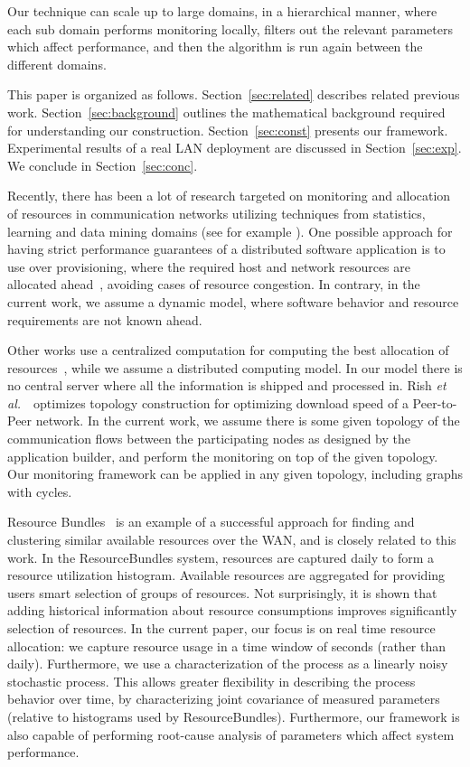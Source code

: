 \documentclass[times, 10pt,twocolumn]{article}
\newcommand\etal{{\textsl{et al.\,}}}
\begin{document}
Our technique can scale up to large domains, in a hierarchical manner, where each sub domain performs monitoring locally, filters out the relevant parameters which affect performance, and then the algorithm is run again between the different domains.

This paper is organized as follows. Section~\ref{sec:related} describes related previous work.
Section~\ref{sec:background} outlines the mathematical background required for understanding our construction.
Section~\ref{sec:const} presents our framework. Experimental results of a real LAN deployment
are discussed in Section~\ref{sec:exp}. We conclude in Section~\ref{sec:conc}.

\label{sec:related}
Recently, there has been a lot of research targeted on
monitoring and allocation of resources
in communication networks utilizing techniques from
statistics, learning and data mining domains (see for
example \cite{Gerry1,Gerry2,ICDCS08-1,ICDCS08-2,ICDCS08-3,
ICDCS08-4}). One possible approach for having strict performance guarantees of a distributed software application is to use over provisioning, where the required host and network resources are allocated ahead~\cite{ICDCS08-3}, avoiding
cases of resource congestion. In contrary, in the current work, we assume a dynamic model, where software behavior and resource requirements are not known ahead.

Other works use a centralized computation for computing the best allocation of resources~\cite{Gerry1,ICDCS08-2},
while we assume a distributed computing model. In our model there is no central server where all the information
is shipped and processed in. Rish \etal~\cite{Gerry2} optimizes topology construction for
optimizing download speed of a Peer-to-Peer network. In the current work, we assume there is some given topology of the communication flows between the participating nodes as designed by the application builder, and perform the monitoring on top of the given topology. Our monitoring framework can be applied in any given topology, including graphs with cycles.



Resource Bundles~\cite{ICDCS08-4} is an example of a successful approach for finding and clustering similar available resources over the WAN, and is closely related to this work. In the ResourceBundles system, resources are captured daily to form a resource utilization histogram. Available resources are aggregated for providing users smart selection of groups of resources.
Not surprisingly, it is shown that adding historical information about resource consumptions improves significantly selection of resources. In the current paper, our focus is on real time resource allocation: we capture resource usage in a time window of seconds (rather than daily). Furthermore, we use a characterization of the process as a linearly noisy stochastic process. This allows greater flexibility in describing the process behavior over time, by characterizing joint covariance of measured parameters (relative to histograms used by ResourceBundles). Furthermore, our framework is also capable of performing root-cause analysis of parameters which affect system performance.
\end{document}

